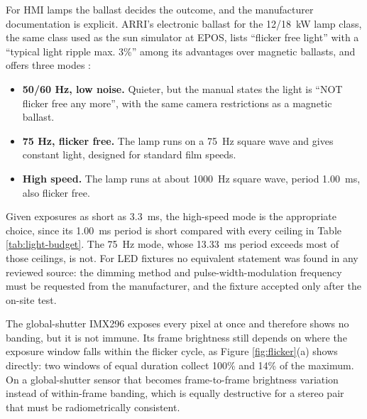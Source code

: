 For HMI lamps the ballast decides the outcome, and the manufacturer documentation is explicit. ARRI's electronic ballast for the 12/18~kW lamp class, the same class used as the sun simulator at EPOS, lists ``flicker free light'' with a ``typical light ripple max. 3\%'' among its advantages over magnetic ballasts, and offers three modes \cite{arri_eb1218_manual}:

\begin{itemize}
    \item \textbf{50/60 Hz, low noise.} Quieter, but the manual states the light is ``NOT flicker free any more'', with the same camera restrictions as a magnetic ballast.
    \item \textbf{75 Hz, flicker free.} The lamp runs on a 75~Hz square wave and gives constant light, designed for standard film speeds.
    \item \textbf{High speed.} The lamp runs at about 1000~Hz square wave, period 1.00~ms, also flicker free.
\end{itemize}

Given exposures as short as 3.3~ms, the high-speed mode is the appropriate choice, since its 1.00~ms period is short compared with every ceiling in Table \ref{tab:light-budget}. The 75~Hz mode, whose 13.33~ms period exceeds most of those ceilings, is not. For LED fixtures no equivalent statement was found in any reviewed source: the dimming method and pulse-width-modulation frequency must be requested from the manufacturer, and the fixture accepted only after the on-site test.

The global-shutter IMX296 exposes every pixel at once \cite{raspberrypi_camera_docs} and therefore shows no banding, but it is not immune. Its frame brightness still depends on where the exposure window falls within the flicker cycle, as Figure \ref{fig:flicker}(a) shows directly: two windows of equal duration collect 100\% and 14\% of the maximum. On a global-shutter sensor that becomes frame-to-frame brightness variation instead of within-frame banding, which is equally destructive for a stereo pair that must be radiometrically consistent.
